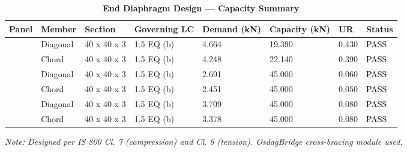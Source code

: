 \begin{longtable}{|C{2.0cm}|L{1.8cm}|C{2.2cm}|C{3.0cm}|C{1.8cm}|C{1.8cm}|C{1.2cm}|C{1.8cm}|}
\caption{\textbf{End Diaphragm Design --- Capacity Summary}}
\hline
\textbf{Panel} & \textbf{Member} & \textbf{Section} & \textbf{Governing LC} & \textbf{Demand (kN)} & \textbf{Capacity (kN)} & \textbf{UR} & \textbf{Status} \\[6pt]
\hline
{} & Diagonal & 40 x 40 x 3 & 1.5 EQ (b) & 4.664 & 19.390 & 0.430 & \textcolor{black}{PASS} \\[6pt]
 & Chord & 40 x 40 x 3 & 1.5 EQ (b) & 4.248 & 22.140 & 0.390 & \textcolor{black}{PASS} \\[6pt]
\hline
{} & Diagonal & 40 x 40 x 3 & 1.5 EQ (b) & 2.691 & 45.000 & 0.060 & \textcolor{black}{PASS} \\[6pt]
 & Chord & 40 x 40 x 3 & 1.5 EQ (b) & 2.451 & 45.000 & 0.050 & \textcolor{black}{PASS} \\[6pt]
\hline
{} & Diagonal & 40 x 40 x 3 & 1.5 EQ (b) & 3.709 & 45.000 & 0.080 & \textcolor{black}{PASS} \\[6pt]
 & Chord & 40 x 40 x 3 & 1.5 EQ (b) & 3.378 & 45.000 & 0.080 & \textcolor{black}{PASS} \\[6pt]
\hline
\end{longtable}
\noindent\textit{Note: Designed per IS 800 Cl. 7 (compression) and Cl. 6 (tension). OsdagBridge cross-bracing module used.}

